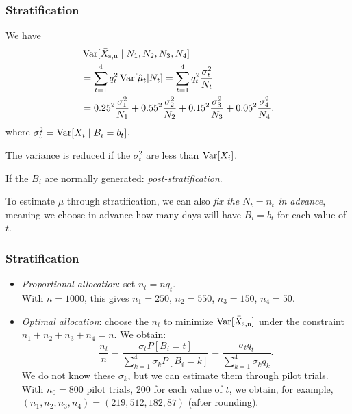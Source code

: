 \documentclass[t,usepdftitle=false,aspectratio=169]{beamer}
\begin{document}
\begin{frame}
	\frametitle{Stratification}
	
	We have 
	\begin{align*}
		&  \operatorname{Var}[\bar X_{\rm{s},n} \mid N_1, N_2, N_3, N_4] \\
		&= \sum_{t=1}^4 q_t^2 \operatorname{Var}[\hat\mu_t | N_t]  
		= \sum_{t=1}^4 q_t^2 \frac{\sigma^2_t}{N_t} \\
		&= 0.25^2 \frac{\sigma^2_1}{N_1} + 0.55^2 \frac{\sigma^2_2}{N_2} + 
		0.15^2 \frac{\sigma^2_3}{N_3} + 0.05^2 \frac{\sigma^2_4}{N_4}.
	\end{align*}
	where \(\sigma^2_t = \operatorname{Var}[X_i\mid B_i=b_t]\).
	
	The variance is reduced if the \(\sigma_t^2\) are less than \(\operatorname{Var}[X_i]\).
	
	If the \(B_i\) are normally generated: \emph{post-stratification}.
	
	To estimate \(\mu\) through stratification, we can also 
	\emph{fix the \(N_t = n_t\) in advance}, meaning we choose 
	in advance how many days will have \(B_i = b_t\) for each value of 
	\(t\).
	
\end{frame}

\begin{frame}
	\frametitle{Stratification}
	
	\begin{itemize}
		\item
		\emph{Proportional allocation}: set \(n_t = n q_t\).\\
		With \(n=1000\), this gives \(n_1 = 250\), \(n_2 = 550\), \(n_3 = 150\), \(n_4 = 50\).
		\item
		\emph{Optimal allocation}: 
		choose the \(n_t\) to minimize \(\operatorname{Var}[\bar X_{\rm{s},n}]\) under the constraint
		\(n_1+n_2+n_3+n_4=n\). We obtain:
		\[
		\frac{{n_t}}{n} 
		= \frac{\sigma_t P[B_i=t]}{\sum_{k=1}^4 \sigma_k P[B_i=k]}
		= \frac{\sigma_t q_t}{\sum_{k=1}^4 \sigma_k q_k}.
		\]
		We do not know these \(\sigma_k\), but we can estimate them through pilot trials.
		With \(n_0=800\) pilot trials, 200 for each value of \(t\), we obtain, for example, \((n_1, n_2, n_3, n_4) = (219, 512, 182, 87)\) (after rounding). 
	\end{itemize}
	
\end{frame}
\end{document}
